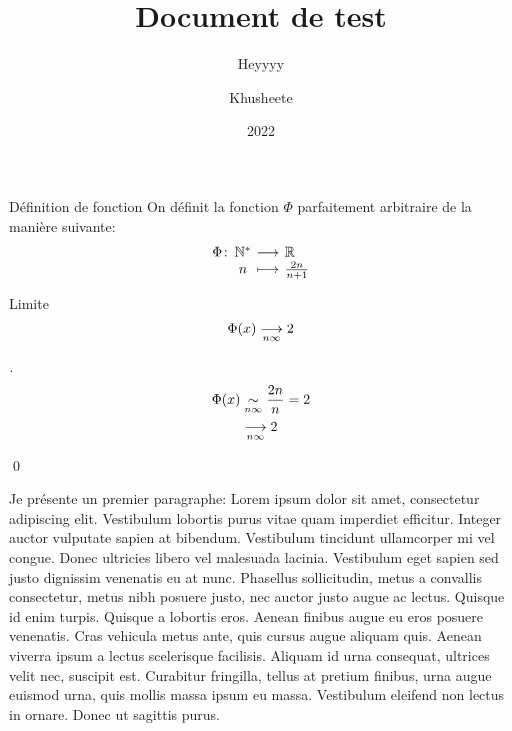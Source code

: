 \documentclass{lecture}
\title{Document de test}
\subtitle{Heyyyy}
\author{Khusheete}
\date{2022}
\begin{document}
\maketitlepage




\begin{definition}[label=deffunc]{Définition de fonction}
    On définit la fonction $\Phi$ parfaitement arbitraire de la manière suivante:
    $$ \function{\Phi}{\N^*}{\R}{n}{ \frac{2n}{n+1} } $$
\end{definition}


\begin{property}[label=philimit]{Limite}
    $$ \Phi(x) \limit{}{n \infty} 2 $$
\end{property}


\begin{proof}[]{}
    \[
        \begin{split}
            \Phi(x) &\fequiv{}{n\infty} \frac{2n}{n} = 2 \\
                    &\limit{}{n\infty} 2
        \end{split}
    \]

    \qed
\end{proof}




Je présente un premier paragraphe: Lorem ipsum dolor sit amet, consectetur
adipiscing elit. Vestibulum lobortis purus vitae quam imperdiet efficitur.
Integer auctor vulputate sapien at bibendum. Vestibulum tincidunt ullamcorper mi
vel congue. Donec ultricies libero vel malesuada lacinia. Vestibulum eget sapien
sed justo dignissim venenatis eu at nunc. Phasellus sollicitudin, metus a
convallis consectetur, metus nibh posuere justo, nec auctor justo augue ac
lectus. Quisque id enim turpis. Quisque a lobortis eros. Aenean finibus augue eu
eros posuere venenatis. Cras vehicula metus ante, quis cursus augue aliquam
quis. Aenean viverra ipsum a lectus scelerisque facilisis. Aliquam id urna
consequat, ultrices velit nec, suscipit est. Curabitur fringilla, tellus at
pretium finibus, urna augue euismod urna, quis mollis massa ipsum eu massa.
Vestibulum eleifend non lectus in ornare. Donec ut sagittis purus.


\end{document}
